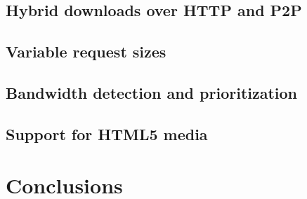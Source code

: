\documentclass[letterpaper,twocolumn,10pt]{article}
\begin{document}

\subsection{Hybrid downloads over HTTP and P2P}


\subsection{Variable request sizes}


\subsection{Bandwidth detection and prioritization}


\subsection{Support for HTML5 media}



\section{Conclusions}



{\footnotesize 
}
\end{document}
